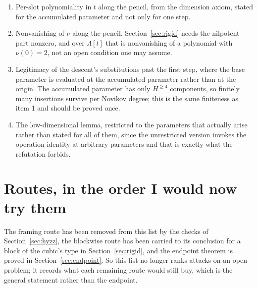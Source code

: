 \documentclass[11pt]{article}
\theoremstyle{definition}
\theoremstyle{remark}
\begin{document}
\begin{enumerate}
\item Per-slot polynomiality in $t$ along the pencil, from the dimension axiom,
  stated for the accumulated parameter and not only for one step.
\item Nonvanishing of $\nu$ along the pencil. Section~\ref{sec:rigid} needs the
  nilpotent part nonzero, and over $\Lambda[t]$ that is nonvanishing of a
  polynomial with $\nu(0)=2$, not an open condition one may assume.
\item Legitimacy of the descent's substitutions past the first step, where the
  base parameter is evaluated at the accumulated parameter rather than at the
  origin. The accumulated parameter has only $H^{\ge4}$ components, so finitely
  many insertions survive per Novikov degree; this is the same finiteness as
  item 1 and should be proved once.
\item The low-dimensional lemma, restricted to the parameters that actually
  arise rather than stated for all of them, since the unrestricted version
  invokes the operation identity at arbitrary parameters and that is exactly what
  the refutation forbids.
\end{enumerate}

\section{Routes, in the order I would now try them}

The framing route has been removed from this list by the checks of
Section~\ref{sec:hyzz}, the blockwise route has been carried to its conclusion
for a block of the cubic's type in Section~\ref{sec:rigid}, and the endpoint
theorem is proved in Section~\ref{sec:endpoint}. So this list no longer ranks
attacks on an open problem; it records what each remaining route would still
buy, which is the general statement rather than the endpoint.
\end{document}
